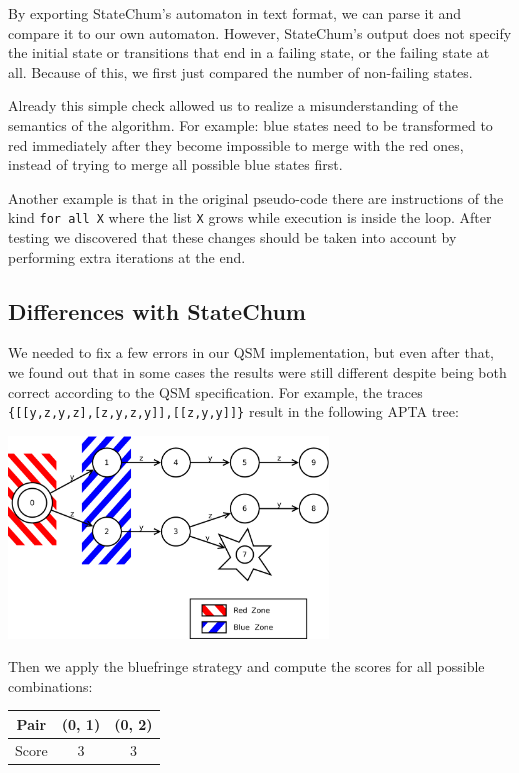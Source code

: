 \documentclass[]{sigplanconf}
\begin{document}
By exporting StateChum's automaton in text format, we can parse it and
compare it to our own automaton. However, StateChum's output does not specify
the initial state or transitions that end in a failing state, or the failing
state at all. Because of this, we first just compared the number of 
non-failing states.

Already this simple check allowed us to realize a misunderstanding
of the semantics of the algorithm. For example: blue states need to
be transformed to red immediately after they become impossible to merge
with the red ones, instead of trying to merge all possible blue states
first.

Another example is that in the original pseudo-code there are
instructions of the kind \texttt{for all X} where the list \texttt{X}
grows while execution is inside the loop. After testing we
discovered that these changes should be taken into account by
performing extra iterations at the end.

\subsection{Differences with StateChum}

We needed to fix a few errors in our QSM implementation, but even after that,
we found out that in some cases the results were still different despite
being both correct according to the QSM specification.
For example, the traces \texttt{\{[[y,z,y,z],[z,y,z,y]],[[z,y,y]]\}} 
result in the following APTA tree:

\begin{center}
\includegraphics[width=8.5cm]{pictures/fsm5.pdf}
\end{center}

Then we apply the bluefringe strategy and compute the scores for all possible
combinations:

\begin{center}
\begin{tabular}{c||c|c}
Pair & (0, 1) & (0, 2)\\\hline\hline
Score & 3 & 3
\end{tabular}
\end{center}
\end{document}
